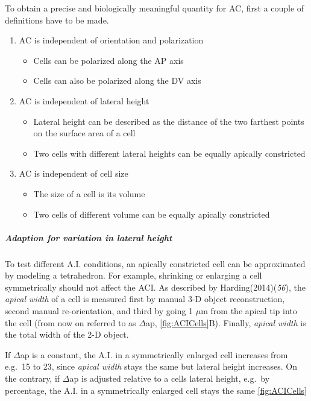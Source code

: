 \documentclass[11pt,singlespacinge,twoside]{reedthesis} %
\providecommand{\tightlist}{%
  \setlength{\itemsep}{0pt}\setlength{\parskip}{0pt}}
\begin{document}
To obtain a precise and biologically meaningful quantity for AC, first a couple of definitions have to be made.
\begin{enumerate}
\def\labelenumi{\arabic{enumi}.}
\tightlist
\item
  AC is independent of orientation and polarization
  \begin{itemize}
  \tightlist
  \item
    Cells can be polarized along the AP axis
  \item
    Cells can also be polarized along the DV axis
  \end{itemize}
\item
  AC is independent of lateral height
  \begin{itemize}
  \tightlist
  \item
    Lateral height can be described as the distance of the two farthest points on the surface area of a cell
  \item
    Two cells with different lateral heights can be equally apically constricted
  \end{itemize}
\item
  AC is independent of cell size
  \begin{itemize}
  \tightlist
  \item
    The size of a cell is its volume
  \item
    Two cells of different volume can be equally apically constricted
  \end{itemize}
\end{enumerate}
\hypertarget{ACI-lat}{%
\subparagraph{Adaption for variation in lateral height}\label{ACI-lat}}

To test different A.I. conditions, an apically constricted cell can be approximated by modeling a tetrahedron. For example, shrinking or enlarging a cell symmetrically should not affect the ACI. As described by Harding(2014)(\emph{56}), the \emph{apical width} of a cell is measured first by manual 3-D object reconstruction, second manual re-orientation, and third by going 1 \(\mu\)m from the apical tip into the cell (from now on referred to as \(\Delta\)ap, \ref{fig:ACICells}B). Finally, \emph{apical width} is the total width of the 2-D object.

If \(\Delta\)ap is a constant, the A.I. in a symmetrically enlarged cell increases from e.g.~15 to 23, since \emph{apical width} stays the same but lateral height increases. On the contrary, if \(\Delta\)ap is adjusted relative to a cells lateral height, e.g.~by percentage, the A.I. in a symmetrically enlarged cell stays the same \ref{fig:ACICells}
\end{document}

